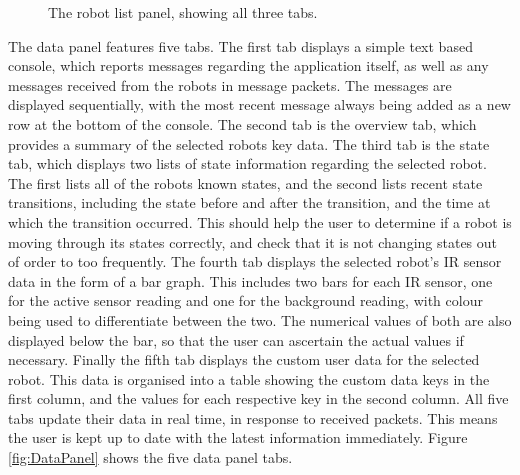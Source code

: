 \begin{figure}
 \centering
 \decoRule
 \caption[Robot List Panel]{The robot list panel, showing all three tabs.}
 \label{fig:RobotListPanel}
\end{figure}

The data panel features five tabs. The first tab displays a simple text based console, which reports messages regarding the application itself, as well as any messages received from the robots in message packets. The messages are displayed sequentially, with the most recent message always being added as a new row at the bottom of the console. The second tab is the overview tab, which provides a summary of the selected robots key data. The third tab is the state tab, which displays two lists of state information regarding the selected robot. The first lists all of the robots known states, and the second lists recent state transitions, including the state before and after the transition, and the time at which the transition occurred. This should help the user to determine if a robot is moving through its states correctly, and check that it is not changing states out of order to too frequently. The fourth tab displays the selected robot's IR sensor data in the form of a bar graph. This includes two bars for each IR sensor, one for the active sensor reading and one for the background reading, with colour being used to differentiate between the two. The numerical values of both are also displayed below the bar, so that the user can ascertain the actual values if necessary. Finally the fifth tab displays the custom user data for the selected robot. This data is organised into a table showing the custom data keys in the first column, and the values for each respective key in the second column. All five tabs update their data in real time, in response to received packets. This means the user is kept up to date with the latest information immediately. Figure \ref{fig:DataPanel} shows the five data panel tabs.


